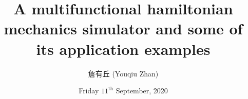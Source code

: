 \documentclass[12pt]{article}
\date{Friday $11^\text{th}$ September, 2020}
\title{A multifunctional hamiltonian mechanics simulator and some of its application examples}
\author{詹有丘 (Youqiu Zhan)}
\begin{document}

\maketitle
\end{document}
